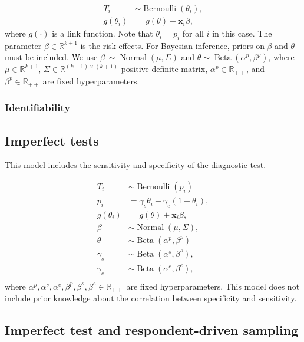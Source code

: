 \documentclass[a4paper, notitlepage, 11pt]{article}
\newcommand{\R}{\mathbb{R}}
\newcommand{\x}{\boldsymbol{x}}
\newcommand{\N}{\operatorname{Normal}}
\newcommand{\betadist}{\operatorname{Beta}}
\theoremstyle{definition}
\theoremstyle{remark}
\begin{document}
\begin{equation}
  \begin{aligned}
    T_i &\sim \operatorname{Bernoulli}(\theta_i), \\
    g(\theta_i) &= g(\theta) + \x_i\beta, 
  \end{aligned}  
\end{equation}
where $g(\cdot)$ is a link function. Note that $\theta_i = p_i$ for all $i$ in this case.
The parameter $\beta \in \R^{k+1}$ is the risk effects. For Bayesian inference, priors on
$\beta$ and $\theta$ must be included. We use $\beta ~ \sim \N(\mu, \Sigma)$
and $\theta \sim \betadist(\alpha^{p}, \beta^p)$, where $\mu
\in \R^{k+1}$, $\Sigma \in \R^{(k+1)\times(k+1)}$ positive-definite matrix,
$\alpha^p \in \R_{++}$, and $\beta^p \in \R_{++}$
are fixed hyperparameters. 

\subsubsection{Identifiability}

\subsection{Imperfect tests}

This model includes the sensitivity and specificity of the diagnostic test. 

\begin{equation}
  \begin{aligned}
    T_i &\sim \operatorname{Bernoulli}(p_i) \\
    p_i &= \gamma_s\theta_i + \gamma_e(1 - \theta_i),  \\
    g(\theta_i) &= g(\theta) + \x_i\beta,  \\
    \beta &\sim \N(\mu, \Sigma), \\ 
    \theta &\sim \betadist(\alpha^p, \beta^p) \\
    \gamma_s &\sim \betadist(\alpha^s, \beta^s), \\
    \gamma_e &\sim \betadist(\alpha^e, \beta^e), \\    
  \end{aligned}  
\end{equation}
where $\alpha^p, \alpha^s, \alpha^e, \beta^p, \beta^s, \beta^e \in \R_{++}$ are fixed hyperparameters.
This model does not include prior knowledge about the correlation between
specificity and sensitivity. 

\subsection{Imperfect test and respondent-driven sampling}
\end{document}

